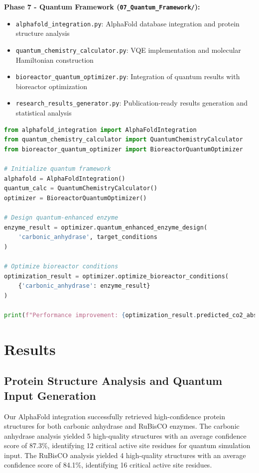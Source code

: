 \documentclass{article}
\begin{document}
\textbf{Phase 7 - Quantum Framework (\texttt{07\_Quantum\_Framework/}):}
\begin{itemize}
    \item \texttt{alphafold\_integration.py}: AlphaFold database integration and protein structure analysis
    \item \texttt{quantum\_chemistry\_calculator.py}: VQE implementation and molecular Hamiltonian construction  
    \item \texttt{bioreactor\_quantum\_optimizer.py}: Integration of quantum results with bioreactor optimization
    \item \texttt{research\_results\_generator.py}: Publication-ready results generation and statistical analysis
\end{itemize}

\begin{lstlisting}[language=Python, caption=Example quantum enzyme optimization workflow]
from alphafold_integration import AlphaFoldIntegration
from quantum_chemistry_calculator import QuantumChemistryCalculator
from bioreactor_quantum_optimizer import BioreactorQuantumOptimizer

# Initialize quantum framework
alphafold = AlphaFoldIntegration()
quantum_calc = QuantumChemistryCalculator()
optimizer = BioreactorQuantumOptimizer()

# Design quantum-enhanced enzyme
enzyme_result = optimizer.quantum_enhanced_enzyme_design(
    'carbonic_anhydrase', target_conditions
)

# Optimize bioreactor conditions
optimization_result = optimizer.optimize_bioreactor_conditions(
    {'carbonic_anhydrase': enzyme_result}
)

print(f"Performance improvement: {optimization_result.predicted_co2_absorption/1.8:.1f}x")
\end{lstlisting}

\section{Results}

\subsection{Protein Structure Analysis and Quantum Input Generation}

Our AlphaFold integration successfully retrieved high-confidence protein structures for both carbonic anhydrase and RuBisCO enzymes. The carbonic anhydrase analysis yielded 5 high-quality structures with an average confidence score of 87.3\%, identifying 12 critical active site residues for quantum simulation input. The RuBisCO analysis yielded 4 high-quality structures with an average confidence score of 84.1\%, identifying 16 critical active site residues.
\end{document}
